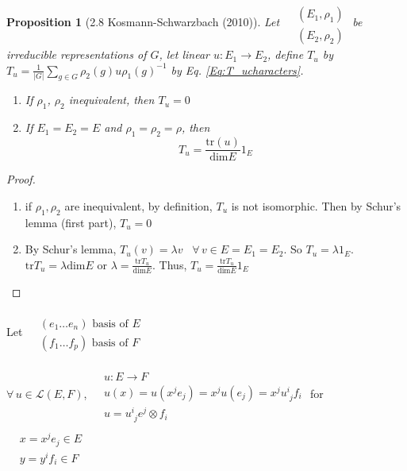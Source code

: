 \documentclass[10pt]{amsart}
\newtheorem{proposition}{Proposition}
\begin{document}
\begin{multicols*}{2}
\begin{proposition}[2.8 Kosmann-Schwarzbach (2010)\cite{YKosmann-Schwarzbach2010}]
Let $\begin{aligned}
  & \quad \\
  & (E_1,\rho_1) \\
  & (E_2,\rho_2) \end{aligned}$ be irreducible representations of $G$, let linear $u:E_1 \to E_2$, define $T_u$ by $T_u = \frac{1}{ |G|} \sum_{g\in G} \rho_2(g) u \rho_1(g)^{-1}$ by Eq. \ref{Eq:T_ucharacters}.  

\begin{enumerate}
  \item[(i)] If $\rho_1$, $\rho_2$ inequivalent, then $T_u=0$
\item[(ii)] If $E_1=E_2= E$ and $\rho_1 = \rho_2 = \rho$, then
\[
T_u = \frac{\text{tr}{(u)}}{ \text{dim}E} 1_E
\]
\end{enumerate}
\end{proposition}

\begin{proof}
\begin{enumerate}
\item[(i)] if $\rho_1,\rho_2$ are inequivalent, by definition, $T_u$ is not isomorphic.  Then by Schur's lemma (first part), $T_u=0$
\item[(ii)] By Schur's lemma, $T_u(v) = \lambda v$ \, $\forall \, v \in E = E_1 = E_2$.  So $T_u = \lambda 1_E$.  $\text{tr}T_u = \lambda \text{dim}E$ or $\lambda = \frac{ \text{tr}T_u}{ \text{dim}E}$.  Thus, $T_u = \frac{\text{tr}{T_u}}{ \text{dim}E}1_E$
\end{enumerate}
\end{proof}

Let $\begin{aligned} & \quad \\
  & (e_1 \dots e_n) \text{ basis of $E$ } \\
  & (f_1 \dots f_p) \text{ basis of $F$ } \end{aligned}$ 

$\forall \, u \in \mathcal{L}(E,F)$, $\begin{aligned} & \quad \\
  & u : E \to F \\
  & u(x) = u(x^j e_j) = x^ju(e_j) = x^ju^i_{ \,\, j}f_i \\
  & u = u^i_{ \,\, j} e^j \otimes f_i \end{aligned}$ for $\begin{aligned} & \quad \\ 
  & x = x^j e_j \in E \\
  & y = y^i f_i \in F \end{aligned}$


\end{multicols*}
\end{document}
